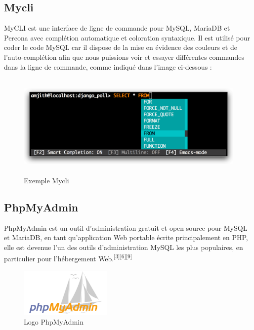 \documentclass[12pt]{report}
\begin{document}
\newpage

\subsection{Mycli}

MyCLI est une interface de ligne de commande pour MySQL, MariaDB et Percona avec complétion automatique et coloration syntaxique. Il est utilisé pour coder le code MySQL car il dispose de la mise en évidence des couleurs et de l'auto-complétion afin que nous puissions voir et essayer différentes commandes dans la ligne de commande, comme indiqué dans l'image ci-dessous :

\begin{figure}[h]
\centering
    \includegraphics[width = 5in, height = 2in]{../Images/mycli.png}
\vspace{-0.2in}
\caption{Exemple Mycli}
\end{figure}

\vspace*{-0.1in}

\subsection{PhpMyAdmin}

PhpMyAdmin est un outil d'administration gratuit et open source pour MySQL et MariaDB, en tant qu'application Web portable écrite principalement en PHP, elle est devenue l'un des outils d'administration MySQL les plus populaires, en particulier pour l'hébergement Web.\textsuperscript{[3][6][9]}

\begin{figure}[h]
\centering
    \includegraphics[width = 1.76in, height = 0.94in]{../Images/PhpMyAdmin.png}
\caption{Logo PhpMyAdmin}
\end{figure}
\end{document}
